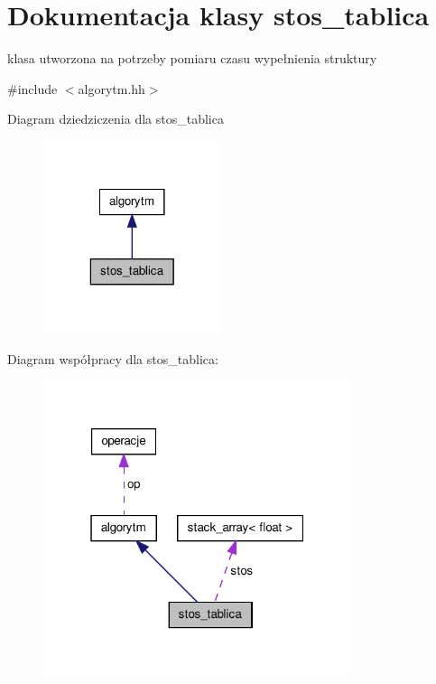 \hypertarget{classstos__tablica}{\section{\-Dokumentacja klasy stos\-\_\-tablica}
\label{classstos__tablica}
}


klasa utworzona na potrzeby pomiaru czasu wypełnienia struktury  




{\ttfamily \#include $<$algorytm.\-hh$>$}



\-Diagram dziedziczenia dla stos\-\_\-tablica
\nopagebreak
\begin{figure}[H]
\begin{center}
\leavevmode
\includegraphics[width=148pt]{classstos__tablica__inherit__graph}
\end{center}
\end{figure}


\-Diagram współpracy dla stos\-\_\-tablica\-:
\nopagebreak
\begin{figure}[H]
\begin{center}
\leavevmode
\includegraphics[width=256pt]{classstos__tablica__coll__graph}
\end{center}
\end{figure}
